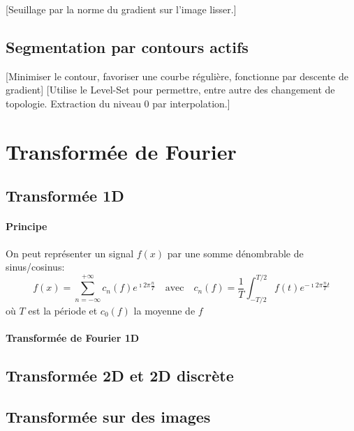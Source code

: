 \documentclass[french]{article}
\begin{document}
[Seuillage par la norme du gradient sur l'image lisser.]
\subsection{Segmentation par contours actifs}

[Minimiser le contour, favoriser une courbe régulière, fonctionne par
descente de gradient]
[Utilise le Level-Set pour permettre, entre autre des changement de
topologie. Extraction du niveau 0 par interpolation.]

\section{Transformée de Fourier}
\subsection{Transformée 1D}
\paragraph{Principe} On peut représenter un signal $f(x)$ par une
somme dénombrable de sinus/cosinus:
$$f(x) = \sum_{n = -\infty}^{+ \infty} c_n(f)e^{\imath 2\pi \frac{n}{T}}
\quad\text{avec}\quad c_n(f) = \frac{1}{T}\int_{-T/2}^{T/2} f(t) e^{-\imath 2\pi \frac{n}{T}t} $$
où $T$ est la période et $c_0(f)$ la moyenne de $f$

\paragraph{Transformée de Fourier 1D}
\subsection{Transformée 2D et 2D discrète}
\subsection{Transformée sur des images}
\end{document}
